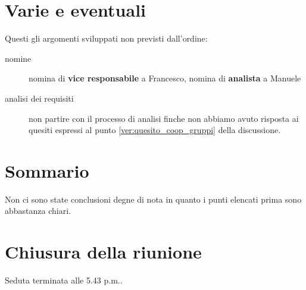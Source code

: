 \section*{Varie e eventuali}
Questi gli argomenti sviluppati non previsti dall'ordine:
\begin{description}
\item[nomine] nomina di \textbf{vice responsabile} a Francesco,
nomina di \textbf{analista} a Manuele
\item[analisi dei requisiti] non partire con il processo di analisi 
finche non abbiamo avuto risposta ai quesiti espressi al punto
\ref{ver:quesito_coop_gruppi} della discussione.
\end{description}

\section*{Sommario}
Non ci sono state conclusioni degne di nota in quanto i punti elencati prima
sono abbastanza chiari.

\section*{Chiusura della riunione}
Seduta terminata alle 5.43 p.m..
